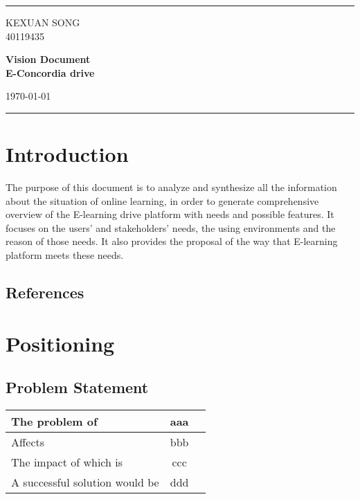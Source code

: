 \documentclass[a4paper]{article}
\begin{document}

\fancyhead[C]{}
\hrule\bigskip %
\begin{minipage}{0.295\textwidth} 
\raggedright
\normalsize
KEXUAN SONG \hfill\\   
40119435\hfill\\
\end{minipage}
\begin{minipage}{0.4\textwidth} 
\centering 
\Large
\textbf{Vision Document}\hfill\\
\textbf{E-Concordia drive}\hfill\\ 
\normalsize 
\end{minipage}
\begin{minipage}{0.295\textwidth} 
\raggedleft
\today\hfill\\
\end{minipage}
\medskip\hrule 
\bigskip


\section{Introduction}
The purpose of this document is to analyze and synthesize all the information about the situation of online learning, in order to generate comprehensive overview of the E-learning drive platform with needs and possible features.  It focuses on the users’ and stakeholders’ needs, the using environments and the reason of those needs. It also provides the proposal of the way that E-learning platform meets these needs.
\subsection{References}


\section{Positioning}
\subsection{Problem Statement}
\begin{table}[htb]
\begin{tabular}{|l|c|r|}
\hline
The problem of                 & aaa \\ \hline
Affects                        & bbb \\ \hline
The impact of which is         & ccc \\ \hline
A successful solution would be & ddd \\
\hline
\end{tabular}
\end{table}


\bigskip




\end{document}
